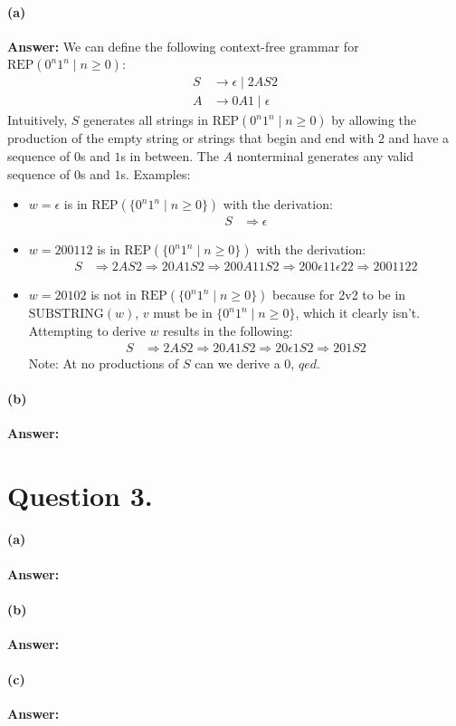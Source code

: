 \documentclass{article}
\theoremstyle{definition}
\newcommand{\SUBSTRING}{\text{SUBSTRING}}
\newcommand{\REP}{\text{REP}}
\renewcommand{\ques}[1]{\section*{Question #1.}}
\begin{document}
    \paragraph*{(a)}
        \textbf{Answer: } We can define the following context-free 
        grammar for $\REP({0^n1^n \mid n \ge 0})$:
        \begin{align*}
        S &\to \epsilon \mid 2AS2\\
        A &\to 0A1 \mid \epsilon
        \end{align*}
        Intuitively, $S$ generates all strings in 
        $\REP({0^n1^n \mid n \ge 0})$ by allowing the production of 
        the empty string or strings that begin and end with $2$ and 
        have a sequence of $0$s and $1$s in between. The $A$ 
        nonterminal generates any valid sequence of $0$s and $1$s.
        Examples:
        \begin{itemize}
        \item $w = \epsilon$ is in $\REP(\{0^n1^n \mid n \ge 0\})$
        with the derivation:
        \begin{align*}
        S &\Rightarrow \epsilon
        \end{align*}
                \item $w = 200112$ is in $\REP(\{0^n1^n \mid n \ge 0\})$
                with the derivation:
        \begin{align*}
        S &\Rightarrow 2AS2 \Rightarrow 20A1S2 \Rightarrow 200A11S2 
        \Rightarrow 200\epsilon11\epsilon22 \Rightarrow 2001122
        \end{align*}

        \item $w = 20102$ is not in $\REP(\{0^n1^n \mid n \ge 0\})$
         because for 2v2 to be in $\SUBSTRING(w)$, $v$ must be in 
         $\{0^n1^n \mid n \ge 0\}$, which it clearly isn't. 
         Attempting to derive $w$ results in the following:
        \begin{align*}
            S &\Rightarrow 2AS2 \Rightarrow 20A1S2 \Rightarrow 
            20\epsilon1S2 \Rightarrow 201S2
        \end{align*}
        Note: At no productions of $S$ can we derive a $0$, $qed$.
    \end{itemize}

    \paragraph*{(b)}
        \textbf{Answer: } 

    \ques{3}
    \paragraph*{(a)} 
        \textbf{Answer: } 
    \paragraph*{(b)}
        \textbf{Answer: }
    \paragraph*{(c)}
        \textbf{Answer: }
\end{document}
